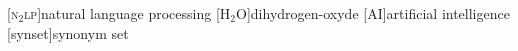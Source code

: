 

[\textsc{n$_2$lp}]{natural language processing}
[H$_2$O]{dihydrogen-oxyde}
[AI]{artificial intelligence}
[synset]{synonym set}
